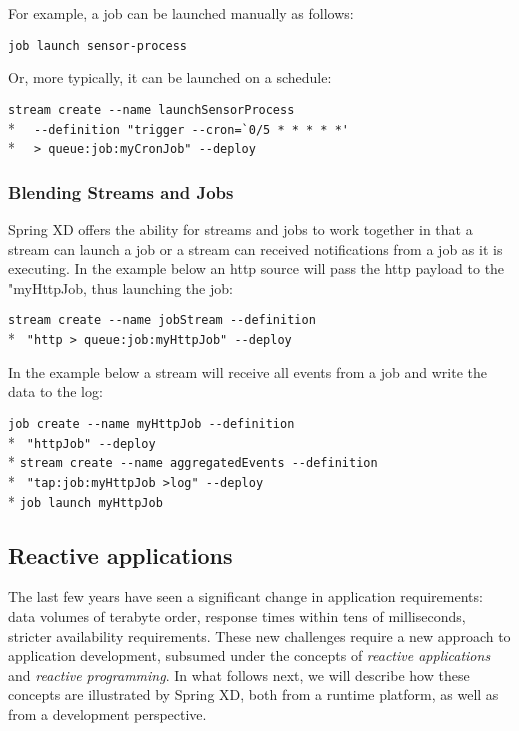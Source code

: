 For example, a job can be launched manually as follows:

\verb;job launch sensor-process;

Or, more typically, it can be launched on a schedule:

\verb;stream create --name launchSensorProcess;\\*
\verb;  --definition "trigger --cron=`0/5 * * * * *';\\* 
\verb;  > queue:job:myCronJob" --deploy;

\subsubsection {Blending Streams and Jobs}

Spring XD offers the ability for streams and jobs to work together in that
a stream can launch a job or a stream can received notifications from a job
as it is executing.  In the example below an http source will pass the http
payload to the "myHttpJob, thus launching the job:

\verb;stream create --name jobStream --definition ;\\*
\verb; "http > queue:job:myHttpJob" --deploy;

In the example below a stream will receive all events from a job and write 
the data to the log:

\verb;job create --name myHttpJob --definition;\\* 
\verb; "httpJob" --deploy;\\*
\verb;stream create --name aggregatedEvents --definition;\\*
\verb; "tap:job:myHttpJob >log" --deploy;\\*
\verb;job launch myHttpJob;

\subsection {Reactive applications}

The last few years have seen a significant change in application requirements:
data volumes of terabyte order, response times within tens of milliseconds, stricter
availability requirements. These new challenges require a new approach to application
development, subsumed under the concepts of \emph{reactive applications} and \emph{reactive
programming}. In what follows next, we will describe how these concepts are
illustrated by Spring XD, both from a runtime platform, as well as from a development perspective.

